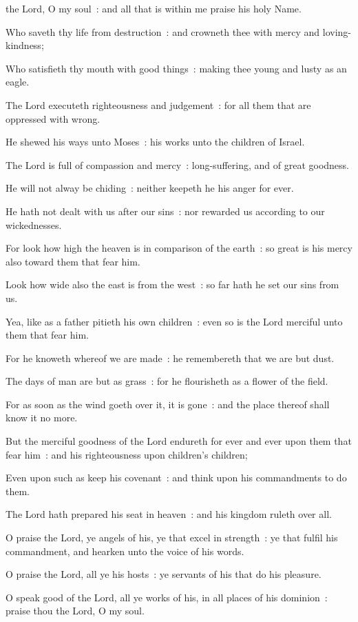  the Lord, O my soul~: and all that is within me praise his holy Name.\par
{}
Who saveth thy life from destruction~: and crowneth thee with mercy and loving-kindness;\par
{}Who satisfieth thy mouth with good things~: making thee young and lusty as an eagle.\par
{}The Lord executeth righteousness and judgement~: for all them that are oppressed with wrong.\par
{}He shewed his ways unto Moses~: his works unto the children of Israel.\par
{}The Lord is full of compassion and mercy~: long-suffering, and of great goodness.\par
{}He will not alway be chiding~: neither keepeth he his anger for ever.\par
{}He hath not dealt with us after our sins~: nor rewarded us according to our wickednesses.\par
{}For look how high the heaven is in comparison of the earth~: so great is his mercy also toward them that fear him.\par
{}Look how wide also the east is from the west~: so far hath he set our sins from us.\par
{}Yea, like as a father pitieth his own children~: even so is the Lord merciful unto them that fear him.\par
{}For he knoweth whereof we are made~: he remembereth that we are but dust.\par
{}The days of man are but as grass~: for he flourisheth as a flower of the field.\par
{}For as soon as the wind goeth over it, it is gone~: and the place thereof shall know it no more.\par
{}But the merciful goodness of the Lord endureth for ever and ever upon them that fear him~: and his righteousness upon children's children;\par
{}Even upon such as keep his covenant~: and think upon his commandments to do them.\par
{}The Lord hath prepared his seat in heaven~: and his kingdom ruleth over all.\par
{}O praise the Lord, ye angels of his, ye that excel in strength~: ye that fulfil his commandment, and hearken unto the voice of his words.\par
{}O praise the Lord, all ye his hosts~: ye servants of his that do his pleasure.\par
{}O speak good of the Lord, all ye works of his, in all places of his dominion~: praise thou the Lord, O my soul.\par


